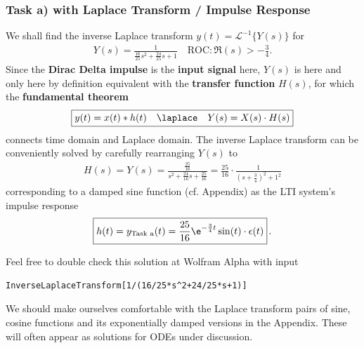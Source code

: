 \subsubsection{Task a) with Laplace Transform / Impulse Response}
\label{sec:TransferFunction}
We shall find the inverse Laplace transform
$y(t) = \mathcal{L}^{-1}\{Y(s)\}$ for
\begin{align}
Y(s) = \frac{1}{\frac{16}{25} s^2 + \frac{24}{25} s + 1}
\quad \text{ROC}: \Re(s) > -\frac{3}{4}.
\end{align}
Since the \textbf{Dirac Delta impulse} is the \textbf{input signal} here,
$Y(s)$ is here and only here by definition equivalent with the
\textbf{transfer function} $H(s)$, for which the \textbf{fundamental theorem}
\begin{align}
\boxed{y(t) = x(t)*h(t) \quad \laplace \quad Y(s) = X(s) \cdot H(s)}
\end{align}
connects time domain and Laplace domain.
%
The inverse Laplace transform can be conveniently solved by carefully
rearranging
$Y(s)$ to
\begin{align}
H(s) = Y(s) = \frac{\frac{25}{16}}{s^2 + \frac{24}{16} s + \frac{25}{16}}=
\frac{25}{16} \cdot \frac{1}{(s + \frac{3}{4})^2 + 1^2}
\end{align}
corresponding to a damped sine function (cf. Appendix) as the LTI system's
impulse response
\begin{align}
\boxed{h(t) = y_\text{Task a}(t) = \frac{25}{16} \e^{-\frac{3}{4} t} \sin(t)
\cdot \epsilon(t)}\,.
\end{align}

Feel free to double check this solution at Wolfram Alpha with input
\begin{verbatim}
InverseLaplaceTransform[1/(16/25*s^2+24/25*s+1)]
\end{verbatim}

We should make ourselves comfortable with the Laplace transform pairs of sine, cosine
functions and its exponentially damped versions in the Appendix.
These will often appear as solutions for ODEs under discussion.


